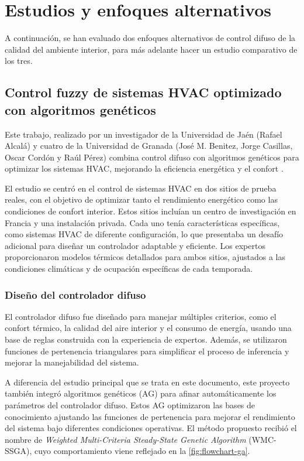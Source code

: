 \section{Estudios y enfoques alternativos}

A continuación, se han evaluado dos enfoques alternativos de control difuso de la calidad del ambiente interior, para más adelante hacer un estudio comparativo de los tres.

\subsection{Control fuzzy de sistemas HVAC optimizado con algoritmos genéticos}

Este trabajo, realizado por un investigador de la Universidad de Jaén (Rafael Alcalá) y cuatro de la Universidad de Granada (José M. Benitez, Jorge Casillas, Oscar Cordón y Raúl Pérez) combina control difuso con algoritmos genéticos para optimizar los sistemas HVAC, mejorando la eficiencia energética y el confort \parencite{alcala2003fuzzy}.

El estudio se centró en el control de sistemas HVAC en dos sitios de prueba reales, con el objetivo de optimizar tanto el rendimiento energético como las condiciones de confort interior. Estos sitios incluían un centro de investigación en Francia y una instalación privada. Cada uno tenía características específicas, como sistemas HVAC de diferente configuración, lo que presentaba un desafío adicional para diseñar un controlador adaptable y eficiente. Los expertos proporcionaron modelos térmicos detallados para ambos sitios, ajustados a las condiciones climáticas y de ocupación específicas de cada temporada.

\subsubsection{Diseño del controlador difuso}

El controlador difuso fue diseñado para manejar múltiples criterios, como el confort térmico, la calidad del aire interior y el consumo de energía, usando una base de reglas construida con la experiencia de expertos. Además, se utilizaron funciones de pertenencia triangulares para simplificar el proceso de inferencia y mejorar la manejabilidad del sistema.

A diferencia del estudio principal que se trata en este documento, este proyecto también integró algoritmos genéticos (AG) para afinar automáticamente los parámetros del controlador difuso. Estos AG optimizaron las bases de conocimiento ajustando las funciones de pertenencia para mejorar el rendimiento del sistema bajo diferentes condiciones operativas. El método propuesto recibió el nombre de \textit{Weighted Multi-Criteria Steady-State Genetic Algorithm} (WMC-SSGA), cuyo comportamiento viene reflejado en la \autoref{fig:flowchart-ga}.

